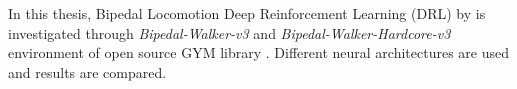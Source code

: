 In this thesis, Bipedal Locomotion Deep Reinforcement Learning (DRL) by is investigated through \textit{Bipedal-Walker-v3} \cite{noauthor_bipedalwalker-v2_2021} and \textit{Bipedal-Walker-Hardcore-v3} \cite{noauthor_bipedalwalkerhardcore-v2_2021} environment of open source GYM library \cite{brockman_openai_2016}. Different neural architectures are used and results are compared. 
